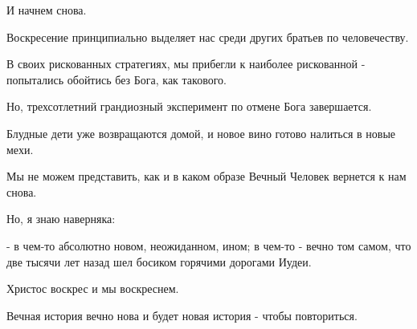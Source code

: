 И начнем снова.

Воскресение принципиально выделяет нас среди других братьев по человечеству.

В своих рискованных стратегиях, мы прибегли к наиболее рискованной - попытались
обойтись без Бога, как такового.

Но, трехсотлетний грандиозный эксперимент по отмене Бога завершается.

Блудные дети уже возвращаются домой, и новое вино готово налиться в новые мехи.

Мы не можем представить, как и в каком образе Вечный Человек вернется к нам снова. 

Но, я знаю наверняка:

- в чем-то абсолютно новом, неожиданном, ином; в чем-то - вечно том самом, что
две тысячи лет назад шел босиком горячими дорогами Иудеи. 

Христос воскрес и мы воскреснем. 

Вечная история вечно нова и будет новая история - чтобы повториться.
